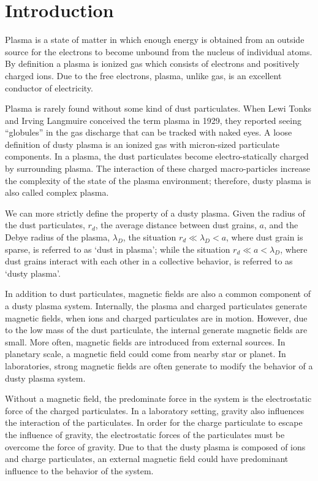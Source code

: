 \section{Introduction}

Plasma is a state of matter in which enough energy is obtained from an outside source for the electrons to become unbound from the nucleus of individual atoms. By definition a plasma is ionized gas which consists of electrons and positively charged ions. Due to the free electrons, plasma, unlike gas, is an excellent conductor of electricity.

Plasma is rarely found without some kind of dust particulates. When Lewi Tonks and Irving Langmuire conceived the term plasma in 1929, they reported seeing ``globules'' in the gas discharge that can be tracked with naked eyes\cite{thomas2013, tonks1929oscillations}. A loose definition of dusty plasma is an ionized gas with micron-sized particulate components. In a plasma, the dust particulates become electro-statically charged by surrounding plasma. The interaction of these charged macro-particles increase the complexity of the state of the plasma environment; therefore, dusty plasma is also called complex plasma.

We can more strictly define the property of a dusty plasma. Given the radius of the dust particulates, $r_d$, the average distance between dust grains, $a$, and the Debye radius of the plasma, $\lambda_D$, the situation $r_d \ll \lambda_D < a$, where dust grain is sparse, is referred to as `dust in plasma'; while the situation $r_d \ll a < \lambda_D$, where dust grains interact with each other in a collective behavior, is referred to as `dusty plasma'\cite{shukla2010introduction}.

In addition to dust particulates, magnetic fields are also a common component of a dusty plasma system. Internally, the plasma and charged particulates generate magnetic fields, when ions and charged particulates are in motion. However, due to the low mass of the dust particulate, the internal generate magnetic fields are small. More often, magnetic fields are introduced from external sources. In planetary scale, a magnetic field could come from nearby star or planet. In laboratories, strong magnetic fields are often generate to modify the behavior of a dusty plasma system.

Without a magnetic field, the predominate force in the system is the electrostatic force of the charged particulates. In a laboratory setting, gravity also influences the interaction of the particulates. In order for the charge particulate to escape the influence of gravity, the electrostatic forces of the particulates must be overcome the force of gravity. Due to that the dusty plasma is composed of ions and charge particulates, an external magnetic field could have predominant influence to the behavior of the system.

